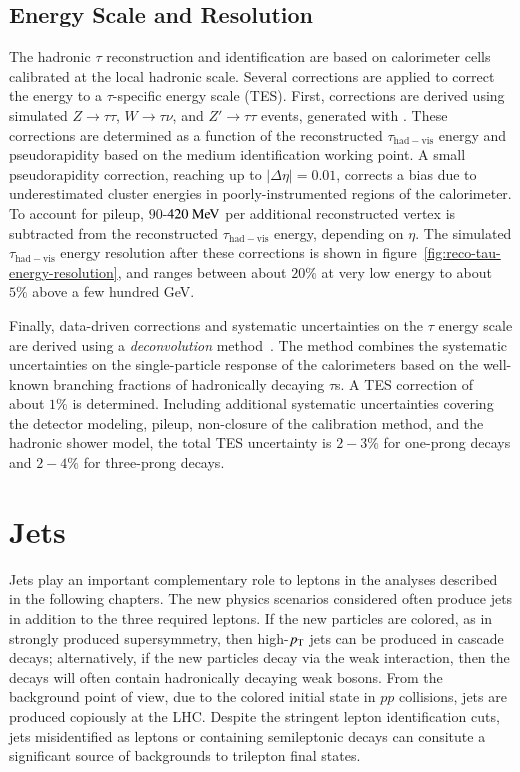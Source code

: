 \subsection{Energy Scale and Resolution}\label{sec:reco-tau-energymomentum}
The hadronic $\tau$ reconstruction and identification are based on calorimeter cells calibrated at the local hadronic scale. Several corrections are applied to correct the energy to a $\tau$-specific energy scale (TES). First, corrections are derived using simulated $Z\rightarrow\tau\tau$, $W\rightarrow\tau\nu$, and $Z'\rightarrow\tau\tau$ events, generated with . These corrections are determined as a function of the reconstructed $\tau_{\mathrm{had-vis}}$ energy and pseudorapidity based on the medium identification working point. A small pseudorapidity correction, reaching up to $|\Delta\eta|=0.01$, corrects a bias due to underestimated cluster energies in poorly-instrumented regions of the calorimeter. To account for pileup, $90$-$420 \MeV$ per additional reconstructed vertex is subtracted from the reconstructed $\tau_{\mathrm{had-vis}}$ energy, depending on $\eta$. The simulated $\tau_{\mathrm{had-vis}}$ energy resolution after these corrections is shown in figure~\ref{fig:reco-tau-energy-resolution}, and ranges between about $20\%$ at very low energy to about $5\%$ above a few hundred GeV.

Finally, data-driven corrections and systematic uncertainties on the $\tau$ energy scale are derived using a \emph{deconvolution} method~\cite{ref-49-from-tau-paper}. The method combines the systematic uncertainties on the single-particle response of the calorimeters based on the well-known branching fractions of hadronically decaying $\tau$s. A TES correction of about $1\%$ is determined. Including additional systematic uncertainties covering the detector modeling, pileup, non-closure of the calibration method, and the hadronic shower model, the total TES uncertainty is $2-3\%$ for one-prong decays and $2-4\%$ for three-prong decays.

\section{Jets}\label{sec:reco-jets}
Jets play an important complementary role to leptons in the analyses described in the following chapters. The new physics scenarios considered often produce jets in addition to the three required leptons. If the new particles are colored, as in strongly produced supersymmetry, then high-$p_{\text{T}}$ jets can be produced in cascade decays; alternatively, if the new particles decay via the weak interaction, then the decays will often contain hadronically decaying weak bosons. From the background point of view, due to the colored initial state in $pp$ collisions, jets are produced copiously at the LHC. Despite the stringent lepton identification cuts, jets misidentified as leptons or containing semileptonic decays can consitute a significant source of backgrounds to trilepton final states.

